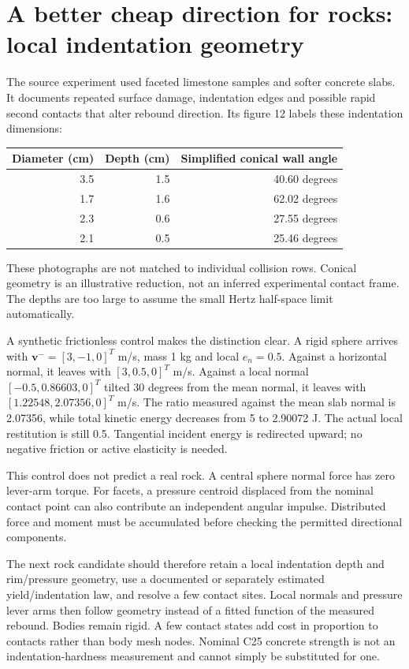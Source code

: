 \documentclass[10pt,a4paper]{article}
\begin{document}
\section*{A better cheap direction for rocks: local indentation geometry}
The source experiment used faceted limestone samples and softer concrete slabs.
It documents repeated surface damage, indentation edges and possible rapid second
contacts that alter rebound direction. Its figure 12 labels these indentation
dimensions:
\begin{center}\small
\begin{tabular}{rrr}\hline
Diameter (cm) & Depth (cm) & Simplified conical wall angle\\\hline
3.5 & 1.5 & 40.60 degrees\\
1.7 & 1.6 & 62.02 degrees\\
2.3 & 0.6 & 27.55 degrees\\
2.1 & 0.5 & 25.46 degrees\\\hline
\end{tabular}\end{center}
These photographs are not matched to individual collision rows. Conical geometry
is an illustrative reduction, not an inferred experimental contact frame. The
depths are too large to assume the small Hertz half-space limit automatically.

A synthetic frictionless control makes the distinction clear. A rigid sphere
arrives with $\mathbf v^-=[3,-1,0]^T$ m/s, mass 1 kg and local $e_n=0.5$.
Against a horizontal normal, it leaves with $[3,0.5,0]^T$ m/s. Against a local
normal $[-0.5,0.86603,0]^T$ tilted 30 degrees from the mean normal, it leaves with
$[1.22548,2.07356,0]^T$ m/s. The ratio measured against the mean slab normal is
2.07356, while total kinetic energy decreases from 5 to 2.90072 J.
The actual local restitution is still 0.5. Tangential incident energy is redirected
upward; no negative friction or active elasticity is needed.

This control does not predict a real rock. A central sphere normal force has zero
lever-arm torque. For facets, a pressure centroid displaced from the nominal contact
point can also contribute an independent angular impulse. Distributed force and
moment must be accumulated before checking the permitted directional components.

The next rock candidate should therefore retain a local indentation depth and
rim/pressure geometry, use a documented or separately estimated yield/indentation
law, and resolve a few contact sites. Local normals and pressure lever arms then
follow geometry instead of a fitted function of the measured rebound. Bodies
remain rigid. A few contact states add cost in proportion to contacts rather than
body mesh nodes. Nominal C25 concrete strength is not an indentation-hardness
measurement and cannot simply be substituted for one.
\end{document}
